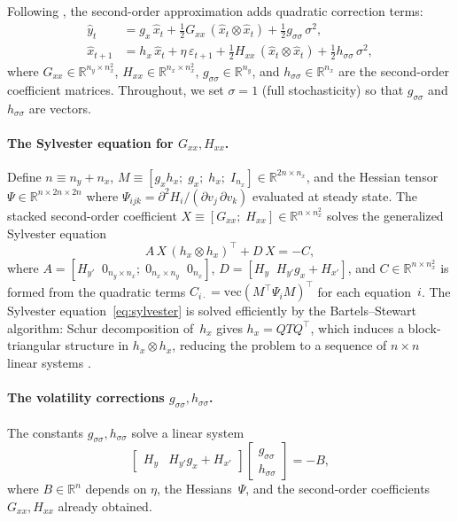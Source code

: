 \documentclass[12pt,a4paper]{article}
\newcommand{\R}{\mathbb{R}}
\newcommand{\vect}{\mathrm{vec}}
\newcommand{\kron}{\otimes}
\newcommand{\gx}{g_x}
\newcommand{\hx}{h_x}
\newcommand{\Gxx}{G_{xx}}
\newcommand{\Hxx}{H_{xx}}
\newcommand{\gss}{{g_{\sigma\sigma}}}
\newcommand{\hsig}{{h_{\sigma\sigma}}}
\begin{document}
Following \citet{schmitt2004solving}, the second-order approximation
adds quadratic correction terms:
\begin{align}
\hat{y}_t &= \gx\,\hat{x}_t
  + \tfrac{1}{2}\Gxx\,(\hat{x}_t \kron \hat{x}_t)
  + \tfrac{1}{2}\gss\,\sigma^2,
  \label{eq:so-y} \\
\hat{x}_{t+1} &= \hx\,\hat{x}_t + \eta\,\varepsilon_{t+1}
  + \tfrac{1}{2}\Hxx\,(\hat{x}_t \kron \hat{x}_t)
  + \tfrac{1}{2}\hsig\,\sigma^2,
  \label{eq:so-x}
\end{align}
where $\Gxx \in \R^{n_y \times n_x^2}$,
$\Hxx \in \R^{n_x \times n_x^2}$,
$\gss \in \R^{n_y}$, and $\hsig \in \R^{n_x}$ are the second-order
coefficient matrices. Throughout, we set $\sigma = 1$ (full
stochasticity) so that $\gss$ and $\hsig$ are vectors.

\paragraph{The Sylvester equation for $\Gxx, \Hxx$.}
Define $n \equiv n_y + n_x$,
$M \equiv [\gx\hx;\;\gx;\;\hx;\;I_{n_x}] \in \R^{2n \times n_x}$,
and the Hessian tensor
$\Psi \in \R^{n \times 2n \times 2n}$ where
$\Psi_{ijk} = \partial^2 H_i / (\partial v_j\,\partial v_k)$
evaluated at steady state. The stacked second-order coefficient
$X \equiv [\Gxx;\;\Hxx] \in \R^{n \times n_x^2}$ solves the
generalized Sylvester equation
\begin{equation}\label{eq:sylvester}
A\,X\,(\hx \kron \hx)^\top + D\,X = -C,
\end{equation}
where
$A = [H_{y'}\;\;0_{n_y \times n_x};\;0_{n_x \times n_y}\;\;0_{n_x}]$,
$D = [H_y\;\;H_{y'}\gx + H_{x'}]$,
and $C \in \R^{n \times n_x^2}$ is formed from the quadratic terms
$C_{i \cdot} = \vect(M^\top \Psi_i M)^\top$ for each equation~$i$.
The Sylvester equation~\eqref{eq:sylvester} is solved efficiently
by the Bartels--Stewart algorithm: Schur decomposition of~$\hx$ gives
$\hx = Q T Q^\top$, which induces a block-triangular structure in
$\hx \kron \hx$, reducing the problem to a sequence of
$n \times n$ linear systems \citep{bartels1972solution}.

\paragraph{The volatility corrections $\gss, \hsig$.}
The constants $\gss, \hsig$ solve a linear system
\begin{equation}\label{eq:volatility}
\begin{bmatrix} H_y & H_{y'}\gx + H_{x'} \end{bmatrix}
\begin{bmatrix} \gss \\ \hsig \end{bmatrix}
= -B,
\end{equation}
where $B \in \R^n$ depends on $\eta$, the Hessians~$\Psi$, and the
second-order coefficients $\Gxx, \Hxx$ already obtained.
\end{document}
